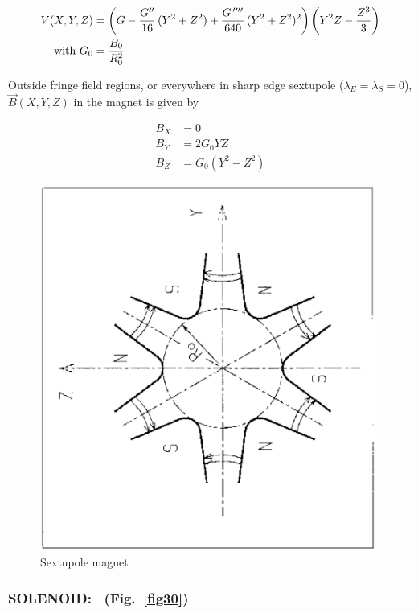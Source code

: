  \begin{align*}
 	V(X,Y,Z)    & =   \left(G- \dfrac{G^{\prime\prime} }{ 16}\, (Y^2+Z^2)+
	             \dfrac{G^{\,\prime\prime\prime\prime} }{ 640}\, (Y^2+Z^2)^2\right) 
	             \left(Y^2Z-\dfrac{Z^3 }{ 3} \right)   \\
\text{with } G_0 &   =  \dfrac{ B_0}{ R^2_0}
\end{align*}

\noindent Outside fringe field regions, or everywhere in sharp edge sextupole 
($ \lambda_E=\lambda_ S=0$),   $ \vec  B(X,Y,Z) $ in the magnet is given by 

\begin{align*}
	B_X &   =     0 \\
	B_Y &   =    2G_0YZ \\
	B_Z &   =     G_0(Y^2-Z^2)  
\end{align*}
\vfill

\begin{figure}[H]
\centerline{\includegraphics[height=12cm,angle=-90]{Fig29.ps}}
\caption{\label{fig29}Sextupole magnet}
\end{figure}
\vfill

\newpage

\subsubsection*{SOLENOID: \SOLENOIDTitl\ (Fig.~\protect\ref{fig30}) } \label{SOLENOID}  

